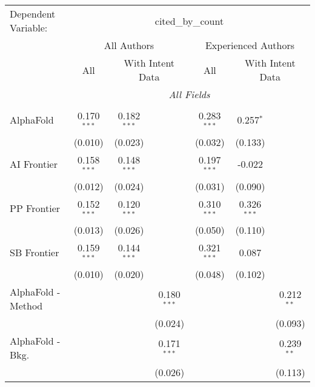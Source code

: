 \begingroup
\centering
\begin{tabular}{lcccccc}
   \tabularnewline \midrule \midrule
   Dependent Variable: & \multicolumn{6}{c}{cited\_by\_count}\\
 & \multicolumn{3}{c}{All Authors} & \multicolumn{3}{c}{Experienced Authors} \\
\cmidrule(lr){2-4} \cmidrule(lr){5-7}
 & \multicolumn{1}{c}{All} & \multicolumn{2}{c}{With Intent Data} & \multicolumn{1}{c}{All} & \multicolumn{2}{c}{With Intent Data} \\
\cmidrule(lr){2-2} \cmidrule(lr){3-4} \cmidrule(lr){5-5} \cmidrule(lr){6-7}
 & \multicolumn{6}{c}{\textit{All Fields}} \\ \\
   AlphaFold            & 0.170$^{***}$ & 0.182$^{***}$ &               & 0.283$^{***}$ & 0.257$^{*}$   &   \\   
                        & (0.010)       & (0.023)       &               & (0.032)       & (0.133)       &   \\   
   AI Frontier          & 0.158$^{***}$ & 0.148$^{***}$ &               & 0.197$^{***}$ & -0.022        &   \\   
                        & (0.012)       & (0.024)       &               & (0.031)       & (0.090)       &   \\   
   PP Frontier          & 0.152$^{***}$ & 0.120$^{***}$ &               & 0.310$^{***}$ & 0.326$^{***}$ &   \\   
                        & (0.013)       & (0.026)       &               & (0.050)       & (0.110)       &   \\   
   SB Frontier          & 0.159$^{***}$ & 0.144$^{***}$ &               & 0.321$^{***}$ & 0.087         &   \\   
                        & (0.010)       & (0.020)       &               & (0.048)       & (0.102)       &   \\   
   AlphaFold - Method   &               &               & 0.180$^{***}$ &               &               & 0.212$^{**}$\\   
                        &               &               & (0.024)       &               &               & (0.093)\\   
   AlphaFold - Bkg.     &               &               & 0.171$^{***}$ &               &               & 0.239$^{**}$\\   
                        &               &               & (0.026)       &               &               & (0.113)\\   

\end{tabular}

